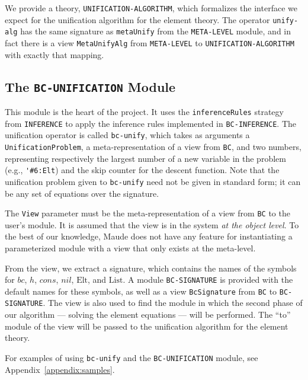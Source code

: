 \documentclass[11pt,twoside,titlepage]{article}
\newcommand{\Elt}{\mathrm{Elt}}
\newcommand{\List}{\mathrm{List}}
\newcommand{\Bc}{\mathit{bc}}
\newcommand{\Hh}{\mathit{h}}
\newcommand{\Cons}{\mathit{cons}}
\newcommand{\Nil}{\mathit{nil}}
\newcommand{\TitleListing}[1]{\texorpdfstring{\lstinline|#1|}{#1}}
\begin{document}
We provide a theory, \lstinline|UNIFICATION-ALGORITHM|, which formalizes the
interface we expect for the unification algorithm for the element theory. The
operator \lstinline|unify-alg| has the same signature as \lstinline|metaUnify|
from the \lstinline|META-LEVEL| module, and in fact there is a view
\lstinline|MetaUnifyAlg| from \lstinline|META-LEVEL| to
\lstinline|UNIFICATION-ALGORITHM| with exactly that mapping.

\subsection{The \TitleListing{BC-UNIFICATION} Module}
\label{subsection:bc-unif-mod}

This module is the heart of the project. It uses the \lstinline|inferenceRules|
strategy from \lstinline|INFERENCE| to apply the inference rules implemented
in \lstinline|BC-INFERENCE|. The unification operator is called
\lstinline|bc-unify|, which takes as arguments a
\lstinline|UnificationProblem|, a meta-representation of a view from
\lstinline|BC|, and two numbers, representing respectively the largest number
of a new variable in the problem (e.g., \lstinline|'#6:Elt|) and the skip
counter for the descent function. Note that the unification problem given
to \lstinline|bc-unify| need not be given in standard form; it can be any set
of equations over the signature.

The \lstinline|View| parameter must be the meta-representation of a view from
\lstinline|BC| to the user's module. It is assumed that the view is in the
system \emph{at the object level}. To the best of our knowledge, Maude does not
have any feature for instantiating a parameterized module with a view that only
exists at the meta-level.

From the view, we extract a signature, which contains the names of the symbols
for $\Bc$, $\Hh$, $\Cons$, $\Nil$, $\Elt$, and $\List$. A module
\lstinline|BC-SIGNATURE| is provided with the default names for these symbols,
as well as a view \lstinline|BcSignature| from \lstinline|BC| to
\lstinline|BC-SIGNATURE|. The view is also used to find the module in which the
second phase of our algorithm --- solving the element equations --- will be
performed. The ``to'' module of the view will be passed to the unification
algorithm for the element theory.

For examples of using \lstinline|bc-unify| and the \lstinline|BC-UNIFICATION|
module, see Appendix~\ref{appendix:samples}.
\end{document}
